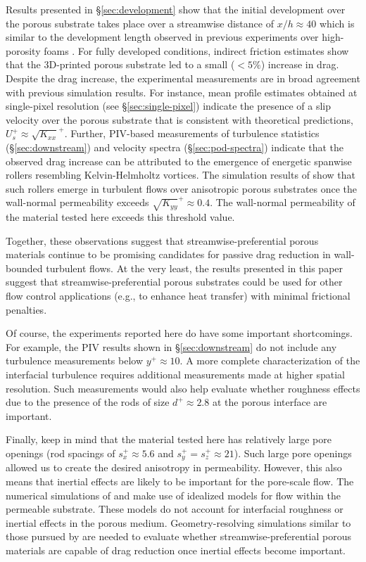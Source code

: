 \documentclass[letterpaper,11pt]{article}
\newcommand{\kpxx}{\sqrt{K_{xx}}^+}
\newcommand{\kpyy}{\sqrt{K_{yy}}^+}
\begin{document}
Results presented in \S\ref{sec:development} show that the initial development over the porous substrate takes place over a streamwise distance of $x/h \approx 40$ which is similar to the development length observed in previous experiments over high-porosity foams \citep{efstathiou2018mean}.  For fully developed conditions, indirect friction estimates show that the 3D-printed porous substrate led to a small ($<5\%$) increase in drag.  Despite the drag increase, the experimental measurements are in broad agreement with previous simulation results. For instance, mean profile estimates obtained at single-pixel resolution (see \S\ref{sec:single-pixel}) indicate the presence of a slip velocity over the porous substrate that is consistent with theoretical predictions, $U_s^+ \approx \kpxx$.  Further, PIV-based measurements of turbulence statistics (\S\ref{sec:downstream}) and velocity spectra (\S\ref{sec:pod-spectra}) indicate that the observed drag increase can be attributed to the emergence of energetic spanwise rollers resembling Kelvin-Helmholtz vortices. The simulation results of \citet{gomez2019turbulent} show that such rollers emerge in turbulent flows over anisotropic porous substrates once the wall-normal permeability exceeds $\kpyy \approx 0.4$.  The wall-normal permeability of the material tested here exceeds this threshold value. 

Together, these observations suggest that streamwise-preferential porous materials continue to be promising candidates for passive drag reduction in wall-bounded turbulent flows. At the very least, the results presented in this paper suggest that streamwise-preferential porous substrates could be used for other flow control applications (e.g., to enhance heat transfer) with minimal frictional penalties. 

Of course, the experiments reported here do have some important shortcomings. For example, the PIV results shown in \S\ref{sec:downstream} do not include any turbulence measurements below $y^+ \approx 10$.  A more complete characterization of the interfacial turbulence requires additional measurements made at higher spatial resolution. Such measurements would also help evaluate whether roughness effects due to the presence of the rods of size $d^+ \approx 2.8$ at the porous interface are important. 

Finally, keep in mind that the material tested here has relatively large pore openings (rod spacings of $s_x^+ \approx 5.6$ and $s_y^+ = s_z^+ \approx 21$).  Such large pore openings allowed us to create the desired anisotropy in permeability.  However, this also means that inertial effects are likely to be important for the pore-scale flow. The numerical simulations of \citet{rosti2018turbulent} and \citet{gomez2019turbulent} make use of idealized models for flow within the permeable substrate. These models do not account for interfacial roughness or inertial effects in the porous medium. Geometry-resolving simulations similar to those pursued by \citet{kuwata2017direct} are needed to evaluate whether streamwise-preferential porous materials are capable of drag reduction once inertial effects become important.
\end{document}

